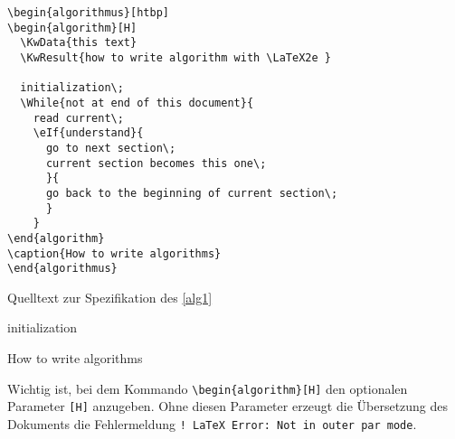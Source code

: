 \clearpage
\begin{programm}[htbp]
\begin{lstlisting}[keywordstyle=\color{black}]
\begin{algorithmus}[htbp]
\begin{algorithm}[H]
  \KwData{this text}
  \KwResult{how to write algorithm with \LaTeX2e }
  
  initialization\;
  \While{not at end of this document}{
    read current\;
    \eIf{understand}{
      go to next section\;
      current section becomes this one\;
      }{
      go back to the beginning of current section\;
      }
    }
\end{algorithm}
\caption{How to write algorithms}
\end{algorithmus}
\end{lstlisting}
\caption{Quelltext zur Spezifikation des \vref{alg1}\label{alg1-quelltext}}
\end{programm}

\vspace{\baselineskip}
\begin{algorithmus}[htbp]
\begin{algorithm}[H]  
  
  initialization\;
\end{algorithm}
\caption{How to write algorithms\label{alg1}}
\end{algorithmus}

Wichtig ist, bei dem Kommando \verb+\begin{algorithm}[H]+ den optionalen Parameter \verb+[H]+ anzugeben. Ohne 
diesen Parameter erzeugt die \"Ubersetzung des Dokuments die Fehlermeldung \glqq{}\verb+! LaTeX Error: Not in outer par mode+\grqq{}.

